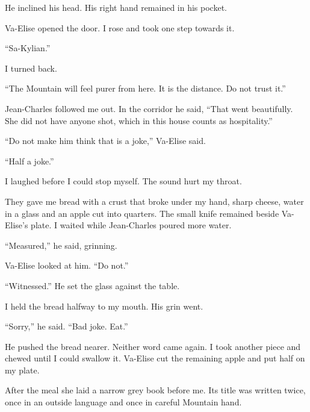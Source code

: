 He inclined his head. His right hand remained in his pocket.\par

Va-Elise opened the door. I rose and took one step towards it.\par

``Sa-Kylian.''\par

I turned back.\par

``The Mountain will feel purer from here. It is the distance. Do not trust it.''\par

Jean-Charles followed me out. In the corridor he said, ``That went beautifully. She did not have anyone shot, which in this house counts as hospitality.''\par

``Do not make him think that is a joke,'' Va-Elise said.\par

``Half a joke.''\par

I laughed before I could stop myself. The sound hurt my throat.\par

\ornament

They gave me bread with a crust that broke under my hand, sharp cheese, water in a glass and an apple cut into quarters. The small knife remained beside Va-Elise's plate. I waited while Jean-Charles poured more water.\par

``Measured,'' he said, grinning.\par

Va-Elise looked at him. ``Do not.''\par

``Witnessed.'' He set the glass against the table.\par

I held the bread halfway to my mouth. His grin went.\par

``Sorry,'' he said. ``Bad joke. Eat.''\par

He pushed the bread nearer. Neither word came again. I took another piece and chewed until I could swallow it. Va-Elise cut the remaining apple and put half on my plate.\par

After the meal she laid a narrow grey book before me. Its title was written twice, once in an outside language and once in careful Mountain hand.\par

